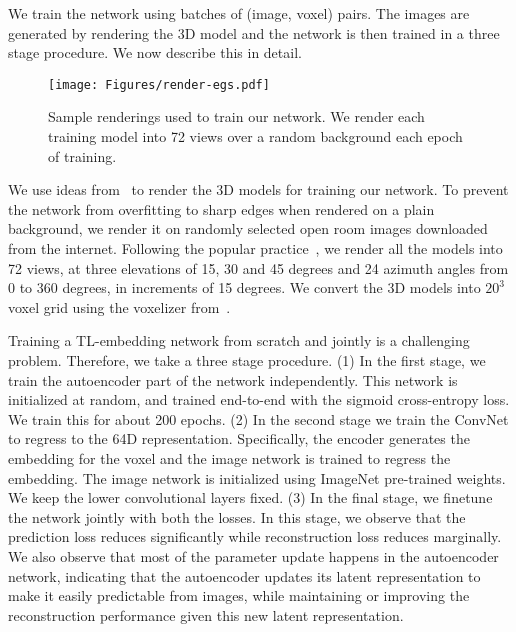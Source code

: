\documentclass[runningheads]{llncs}
\begin{document}
We train the network using batches of (image, voxel) pairs. The images are
generated by rendering the 3D model and the network is then trained in a three
stage procedure. We now describe this in detail.

\begin{figure}[t]
\centering
\texttt{[image: Figures/render-egs.pdf]}
\caption{Sample renderings used to train 
our network.
We render each training model
into 72 views
over a random background each epoch of training.}
\label{fig:render-egs}
\end{figure}
We use ideas from~\cite{Su_2015_ICCV} to render the 3D models for training our
network. To prevent the network from overfitting to sharp edges when rendered
on a plain background, we render it on randomly selected open room images
downloaded from the internet. Following the popular practice~\cite{su15mvcnn},
we render all the models into 72 views, at
three elevations of 15, 30 and 45
degrees and 24 azimuth angles from 0 to 360 degrees, in increments of
15 degrees. We convert the 3D models into $20^3$ voxel
grid using the voxelizer from~\cite{3dshapenet}.

Training a TL-embedding network from scratch
and jointly is a challenging problem. 
Therefore, we take a three stage procedure.
(1) In the first stage, we train the autoencoder part
of the network independently. This network is
initialized at random, and trained end-to-end with the sigmoid cross-entropy
loss. We train this for about 200 epochs. 
(2) In the second stage we train the ConvNet to regress to the 64D representation.
Specifically, the encoder generates the embedding for the voxel and the image
network is trained to regress the embedding.
The image network is initialized using ImageNet pre-trained weights.
We keep the lower convolutional layers fixed.
(3) In the final stage, we finetune the network jointly
with both the losses.
In this stage, we observe that the prediction loss reduces significantly while reconstruction
loss reduces marginally. We also observe that most of 
the parameter update happens in the autoencoder network, indicating that the autoencoder
updates its latent representation to make it easily predictable from images, while maintaining or
improving the reconstruction performance given this new latent representation.
\end{document}
